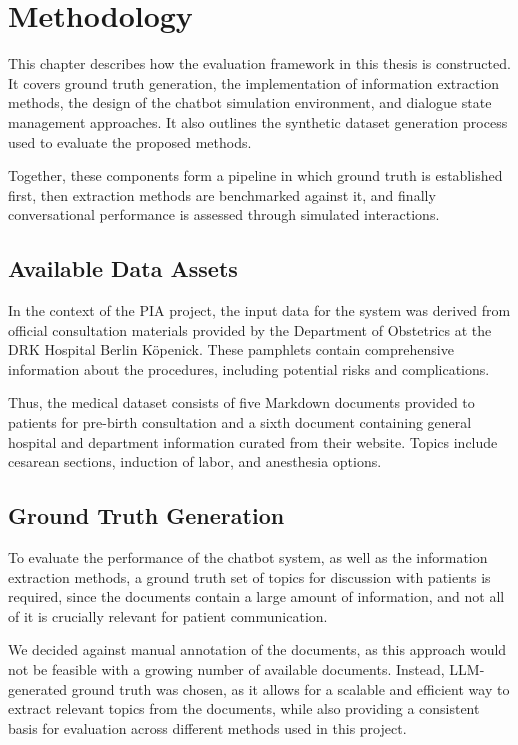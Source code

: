 \chapter{Methodology}

This chapter describes how the evaluation framework in this thesis is constructed. 
It covers ground truth generation, the implementation of information extraction methods, the design of the chatbot simulation environment, and dialogue state management approaches. 
It also outlines the synthetic dataset generation process used to evaluate the proposed methods.

Together, these components form a pipeline in which ground truth is established first, then extraction methods are benchmarked against it, and finally conversational performance is assessed through simulated interactions.

\section{Available Data Assets}

In the context of the PIA project, the input data for the system was derived from official consultation materials provided by the Department of Obstetrics at the DRK Hospital Berlin Köpenick.
These pamphlets contain comprehensive information about the procedures, including potential risks and complications. 

Thus, the medical dataset consists of five Markdown documents provided to patients for pre-birth consultation and a sixth document containing general hospital and department information curated from their website. 
Topics include cesarean sections, induction of labor, and anesthesia options. 

\section{Ground Truth Generation}

To evaluate the performance of the chatbot system, as well as the information extraction methods, a ground truth set of topics for discussion with patients is required, since the documents contain a large amount of information, and not all of it is crucially relevant for patient communication.

We decided against manual annotation of the documents, as this approach would not be feasible with a growing number of available documents.
Instead, LLM-generated ground truth was chosen, as it allows for a scalable and efficient way to extract relevant topics from the documents, while also providing a consistent basis for evaluation across different methods used in this project.


